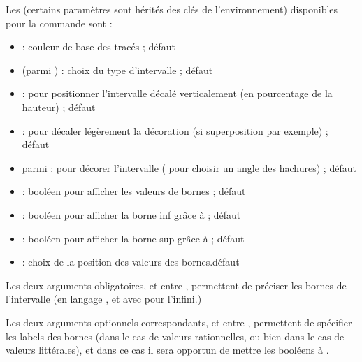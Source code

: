 \begin{cautionblock}
Les  (certains paramètres sont hérités des clés de l'environnement) disponibles pour la commande  sont :

\begin{itemize}
	\item {} : couleur de base des tracés ; \hfill{}défaut 
	\item {} (parmi ) : choix du type d'intervalle ; \hfill{}défaut 
	\item {} : pour positionner l'intervalle décalé verticalement (en pourcentage de la hauteur) ; \hfill{}défaut 
	\item {} : pour décaler légèrement la décoration (si superposition par exemple) ; \hfill{}défaut \Cle{0pt}
	\item {} parmi  : pour décorer l'intervalle ( pour choisir un angle des hachures) ; \hfill{}défaut \Cle{\{\}}
	\item {} : booléen pour afficher les valeurs de bornes ; \hfill{}défaut 
	\item {} : booléen pour afficher la borne inf grâce à  ; \hfill{}défaut 
	\item {} : booléen pour afficher la borne sup grâce à  ; \hfill{}défaut 
	\item {} : choix de la position des valeurs des bornes.\hfill{}défaut 
\end{itemize}

Les deux arguments obligatoires, et entre , permettent de préciser les bornes de l'intervalle (en langage \TikZ, et avec \ctex{*} pour l'infini.)

 Les deux arguments optionnels correspondants, et entre \ctex{[...]}, permettent de spécifier les labels des bornes (dans le cas de valeurs rationnelles, ou bien dans le cas de valeurs littérales), et dans ce cas il sera opportun de mettre les booléens  à .
\end{cautionblock}

\begin{PresCodePL}{}
\begin{RepIntervalles}[Elargir=0.025,xmin=-100,xmax=200,Unite=auto,Largeur=10, Graduations={-100,-90,...,200},GraduationsAlt={-100,-50,...,200}, Valeurs={-100,-50,...,200},Police=\scriptsize,EpTrait=0.6pt]
\end{RepIntervalles}
\end{PresCodePL}

